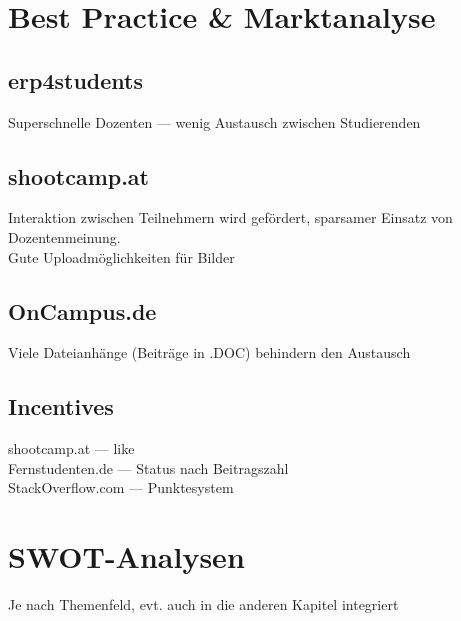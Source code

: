 \section{Best Practice \& Marktanalyse} %
\label{sec:best_practice}

\subsection{erp4students} %
\label{sub:erp4students}
Superschnelle Dozenten --- wenig Austausch zwischen Studierenden

\subsection{shootcamp.at} %
\label{sub:shootcamp_at}
Interaktion zwischen Teilnehmern wird gefördert, sparsamer Einsatz von Dozentenmeinung.\\
Gute Uploadmöglichkeiten für Bilder

\subsection{OnCampus.de} %
\label{sub:oncampus_de}
Viele Dateianhänge (Beiträge in .DOC) behindern den Austausch

\subsection{Incentives} %
\label{sub:infentives}
shootcamp.at --- like\\
Fernstudenten.de --- Status nach Beitragszahl\\
StackOverflow.com --- Punktesystem


\section{SWOT-Analysen} %
\label{sec:swot_analysen}
Je nach  Themenfeld, evt. auch in die anderen Kapitel integriert
